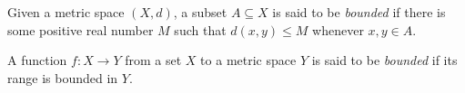 \documentclass{article}
\begin{document}
Given a metric space $(X, d)$, a subset $A\subseteq X$ is said to be \emph{bounded} if there is some positive real number $M$ such that $d(x, y)\leq M$ whenever $x, y \in A$.

A function $f : X \rightarrow Y$ from a set $X$ to a metric space $Y$ is said to be \emph{bounded} if its range is bounded in $Y$.
\end{document}
